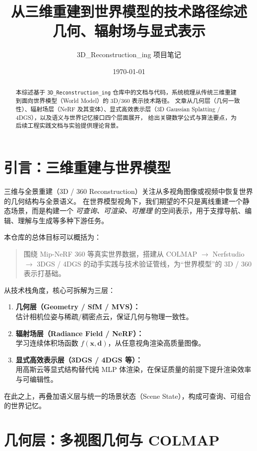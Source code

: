 \documentclass[12pt]{ctexart}
\title{从三维重建到世界模型的技术路径综述\\[4pt]\large 几何、辐射场与显式表示}
\author{3D\_Reconstruction\_ing 项目笔记}
\date{\today}
\begin{document}
\maketitle

\begin{abstract}
本综述基于 \texttt{3D\_Reconstruction\_ing} 仓库中的文档与代码，系统梳理从传统三维重建到面向世界模型（World Model）的 3D/360 表示技术路径。
文章从几何层（几何一致性）、辐射场层（NeRF 及其变体）、显式高效表示层（3D Gaussian Splatting / 4DGS），以及语义与世界记忆接口四个层面展开，
给出关键数学公式与算法要点，为后续工程实践文档与实验提供理论背景。
\end{abstract}

\tableofcontents

\section{引言：三维重建与世界模型}

三维与全景重建（3D / 360 Reconstruction）关注从多视角图像或视频中恢复世界的几何结构与全景语义。
在世界模型视角下，我们期望的不只是离线重建一个静态场景，而是构建一个
\emph{可查询、可渲染、可推理} 的空间表示，用于支撑导航、编辑、理解与生成等多种下游任务。

本仓库的总体目标可以概括为：
\begin{quote}
围绕 Mip-NeRF 360 等真实世界数据，搭建从 COLMAP $\to$ Nerfstudio $\to$ 3DGS / 4DGS 的动手实践与技术验证管线，为“世界模型”的 3D / 360 表示打基础。
\end{quote}

从技术栈角度，核心可拆解为三层：
\begin{enumerate}
  \item \textbf{几何层（Geometry / SfM / MVS）：}\\
  估计相机位姿与稀疏/稠密点云，保证几何与物理一致性。
  \item \textbf{辐射场层（Radiance Field / NeRF）：}\\
  学习连续体积场函数 $f(\bm{x},\bm{d})$，从任意视角渲染高质量图像。
  \item \textbf{显式高效表示层（3DGS / 4DGS 等）：}\\
  用高斯云等显式结构替代纯 MLP 体渲染，在保证质量的前提下提升渲染效率与可编辑性。
\end{enumerate}

在此之上，再叠加语义层与统一的场景状态（Scene State），构成可查询、可组合的世界记忆。

\section{几何层：多视图几何与 COLMAP}
\end{document}
